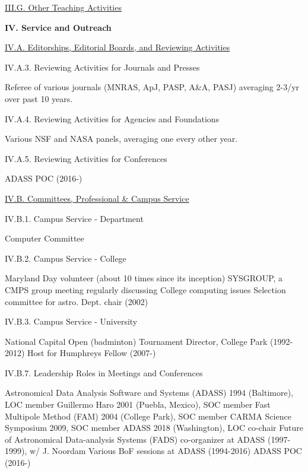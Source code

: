 \documentclass[11pt,letterpaper]{article}
\newcommand{\newi}{\newline\indent}
\begin{document}
\underline{III.G. Other Teaching Activities}


\textbf{IV. Service and Outreach}


\underline{IV.A. Editorships, Editorial Boards, and Reviewing Activities}




IV.A.3. Reviewing Activities for Journals and Presses

Referee of various journals (MNRAS, ApJ, PASP, A\&A, PASJ) averaging 2-3/yr over past 10 years.


IV.A.4. Reviewing Activities for Agencies and Foundations

Various NSF and NASA panels, averaging one every other year.

IV.A.5. Reviewing Activities for Conferences

ADASS POC (2016-)




\underline{IV.B. Committees, Professional \& Campus Service}

IV.B.1. Campus Service - Department

Computer Committee

IV.B.2. Campus Service - College

Maryland Day volunteer (about 10 times since its inception)\newi
SYSGROUP, a CMPS group meeting regularly discussing College computing issues\newi
Selection committee for astro. Dept. chair (2002)\newi

IV.B.3. Campus Service - University
                
National Capital Open  (badminton) Tournament Director, College Park (1992-2012)\newi
Host for Humphreys Fellow (2007-)\newi





IV.B.7. Leadership Roles in Meetings and Conferences

Astronomical Data Analysis Software and Systems (ADASS) 1994 (Baltimore), LOC member\newi
Guillermo Haro 2001 (Puebla, Mexico), SOC member\newi
Fast Multipole Method (FAM) 2004 (College Park), SOC member\newi
CARMA Science Symposium 2009, SOC member\newi
ADASS 2018 (Washington), LOC co-chair\newi
Future of Astronomical Data-analysis Systems (FADS) co-organizer at ADASS (1997-1999), w/ J. Noordam\newi
Various BoF sessions at ADASS (1994-2016)\newi      
ADASS POC (2016-)\newi
\end{document}
